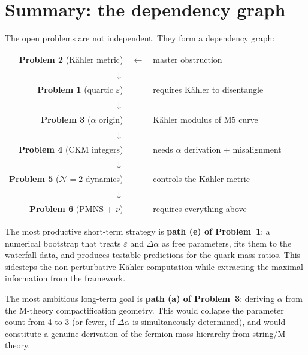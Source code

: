 \documentclass[12pt,a4paper]{article}
\begin{document}
\section{Summary: the dependency graph}
\label{sec:summary}

The open problems are not independent.  They form a dependency graph:

\bigskip

\begin{center}
\begin{tabular}{rcl}
  \textbf{Problem 2} (K\"ahler metric) & $\longleftarrow$ & master obstruction \\
  $\downarrow$ && \\
  \textbf{Problem 1} (quartic $\varepsilon$) & & requires K\"ahler to disentangle \\
  $\downarrow$ && \\
  \textbf{Problem 3} ($\alpha$ origin) & & K\"ahler modulus of M5 curve \\
  $\downarrow$ && \\
  \textbf{Problem 4} (CKM integers) & & needs $\alpha$ derivation + misalignment \\
  $\downarrow$ && \\
  \textbf{Problem 5} ($\mathcal{N}{=}2$ dynamics) & & controls the K\"ahler metric \\
  $\downarrow$ && \\
  \textbf{Problem 6} (PMNS + $\nu$) & & requires everything above \\
\end{tabular}
\end{center}

\bigskip

\noindent The most productive short-term strategy is \textbf{path (e) of
Problem~1}: a numerical bootstrap that treats $\varepsilon$ and
$\Delta\alpha$ as free parameters, fits them to the waterfall data,
and produces testable predictions for the quark mass ratios.  This
sidesteps the non-perturbative K\"ahler computation while extracting
the maximal information from the framework.

The most ambitious long-term goal is \textbf{path (a) of Problem~3}:
deriving $\alpha$ from the M-theory compactification geometry.  This
would collapse the parameter count from 4 to 3 (or fewer, if $\Delta\alpha$
is simultaneously determined), and would constitute a genuine derivation
of the fermion mass hierarchy from string/M-theory.
\end{document}
